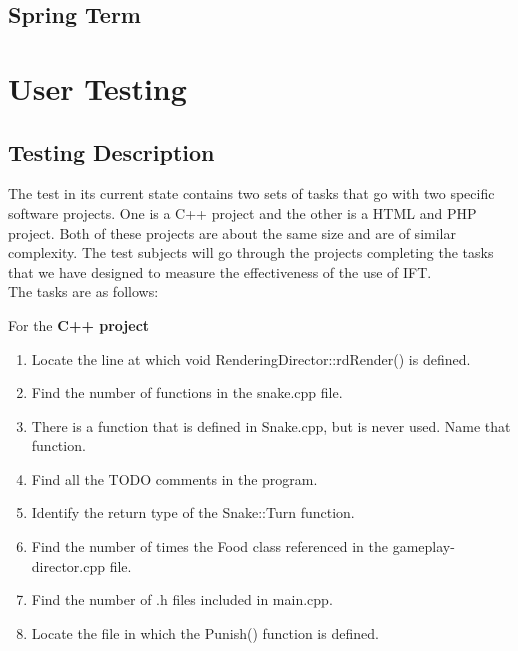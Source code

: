 \documentclass[letterpaper,10pt,titlepage,draftclsnofoot,onecolumn,onesided] {IEEEtran}
\begin{document}
	
	\subsection{Spring Term}

\section{User Testing}
	

	\subsection{Testing Description}
	The test in its current state contains two sets of tasks that go with two specific software projects. 
	One is a C++ project and the other is a HTML and PHP project. 
	Both of these projects are about the same size and are of similar complexity. 
	The test subjects will go through the projects completing the tasks that we have designed to measure the effectiveness of the use of IFT. 
	\\
	The tasks are as follows: 
	
	For the \textbf{C++ project}
	\begin{enumerate}
		\item Locate the line at which void RenderingDirector::rdRender() is defined. 
		\item Find the number of functions in the snake.cpp file.
		\item There is a function that is defined in Snake.cpp, but is never used. Name that function.
		\item Find all the TODO comments in the program.
		\item Identify the return type of the Snake::Turn function.
		\item Find the number of times the Food class referenced in the gameplay-director.cpp file.
		\item Find the number of .h files included in main.cpp.
		\item Locate the file in which the Punish() function is defined.
	\end{enumerate}
	
\end{document}
